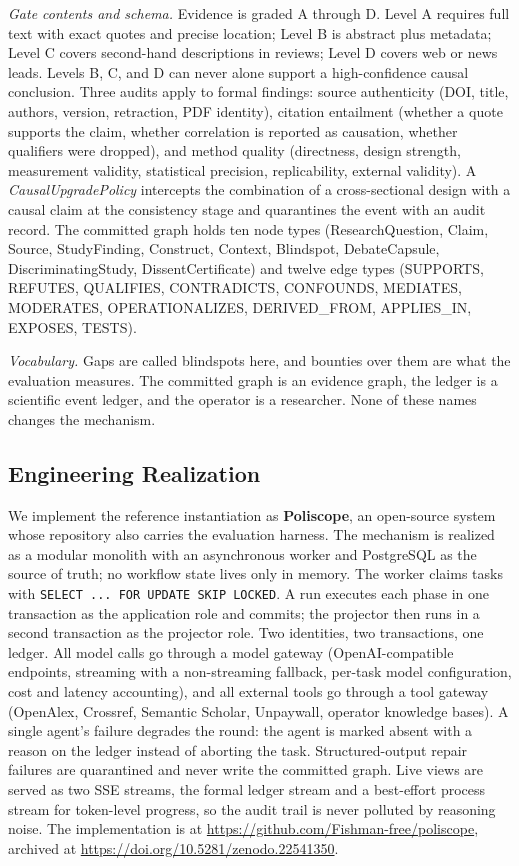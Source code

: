 \emph{Gate contents and schema.} Evidence is graded A through D. Level A
requires full text with exact quotes and precise location; Level B is abstract
plus metadata; Level C covers second-hand descriptions in reviews; Level D
covers web or news leads. Levels B, C, and D can never alone support a
high-confidence causal conclusion. Three audits apply to formal findings:
source authenticity (DOI, title, authors, version, retraction, PDF identity),
citation entailment (whether a quote supports the claim, whether correlation is
reported as causation, whether qualifiers were dropped), and method quality
(directness, design strength, measurement validity, statistical precision,
replicability, external validity). A \emph{CausalUpgradePolicy} intercepts the
combination of a cross-sectional design with a causal claim at the consistency
stage and quarantines the event with an audit record. The committed graph holds
ten node types (ResearchQuestion, Claim, Source, StudyFinding, Construct,
Context, Blindspot, DebateCapsule, DiscriminatingStudy, DissentCertificate) and
twelve edge types (SUPPORTS, REFUTES, QUALIFIES, CONTRADICTS, CONFOUNDS,
MEDIATES, MODERATES, OPERATIONALIZES, DERIVED\_FROM, APPLIES\_IN, EXPOSES,
TESTS).

\emph{Vocabulary.} Gaps are called blindspots here, and bounties over them are
what the evaluation measures. The committed graph is an evidence graph, the
ledger is a scientific event ledger, and the operator is a researcher. None of
these names changes the mechanism.

\subsection{Engineering Realization}

We implement the reference instantiation as \textbf{Poliscope}, an open-source
system whose repository also carries the evaluation harness. The mechanism is
realized as a modular monolith with an asynchronous worker and PostgreSQL as
the source of truth; no workflow state lives only in memory. The worker claims
tasks with \texttt{SELECT ... FOR UPDATE SKIP LOCKED}. A run executes each
phase in one transaction as the application role and commits; the projector
then runs in a second transaction as the projector role. Two identities, two
transactions, one ledger. All model calls go through a model gateway
(OpenAI-compatible endpoints, streaming with a non-streaming fallback,
per-task model configuration, cost and latency accounting), and all external
tools go through a tool gateway (OpenAlex, Crossref, Semantic Scholar,
Unpaywall, operator knowledge bases). A single agent's failure degrades the
round: the agent is marked absent with a reason on the ledger instead of
aborting the task. Structured-output repair failures are quarantined and never
write the committed graph. Live views are served as two SSE streams, the
formal ledger stream and a best-effort process stream for token-level
progress, so the audit trail is never polluted by reasoning noise. The
implementation is at \url{https://github.com/Fishman-free/poliscope},
archived at \url{https://doi.org/10.5281/zenodo.22541350}.

